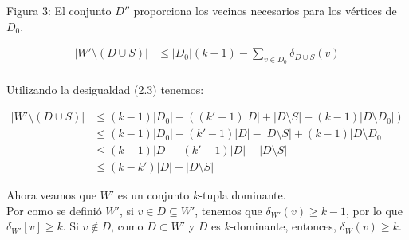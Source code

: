\documentclass{article}
\begin{document}
\begin{center}
\begin{tikzpicture}[scale=1.2]
    
    
    
    
    

\end{tikzpicture}

\vspace{0.5cm}
Figura 3: \small{El conjunto $D''$ proporciona los vecinos necesarios para los vértices de $D_0$}.

\end{center}


\begin{align*}
|W'\setminus (D\cup S)| & \leq |D_{0}|(k-1) - \sum_{v\in D_{0}} \delta_{D\cup S}(v)\\
\end{align*}

Utilizando la desigualdad (2.3) tenemos: 

\begin{align*}
	|W'\setminus (D\cup S)| & \leq (k-1)|D_{0}| - ((k'-1)|D| + |D\setminus S| - (k-1)|D \setminus D_{0}|) \\
    & \leq (k-1)|D_{0}| - (k'-1)|D| - |D\setminus S| + (k-1)|D\setminus D_{0}|\\
    & \le (k-1)|D| - (k'-1)|D| - |D\setminus S|\\
    & \le (k - k')|D| - |D \setminus S|
\end{align*}

Ahora veamos que $W'$ es un conjunto $k$-tupla dominante. \\
Por como se definió $W'$, si $v\in D \subseteq W'$, tenemos que $\delta_{W'}(v) \geq k-1$, por lo que $\delta_{W'}[v]\geq k$. Si $v\notin D$, como $D\subset W'$ y $D$ es $k$-dominante, entonces, $\delta_{W}(v) \geq k$.
\end{document}
